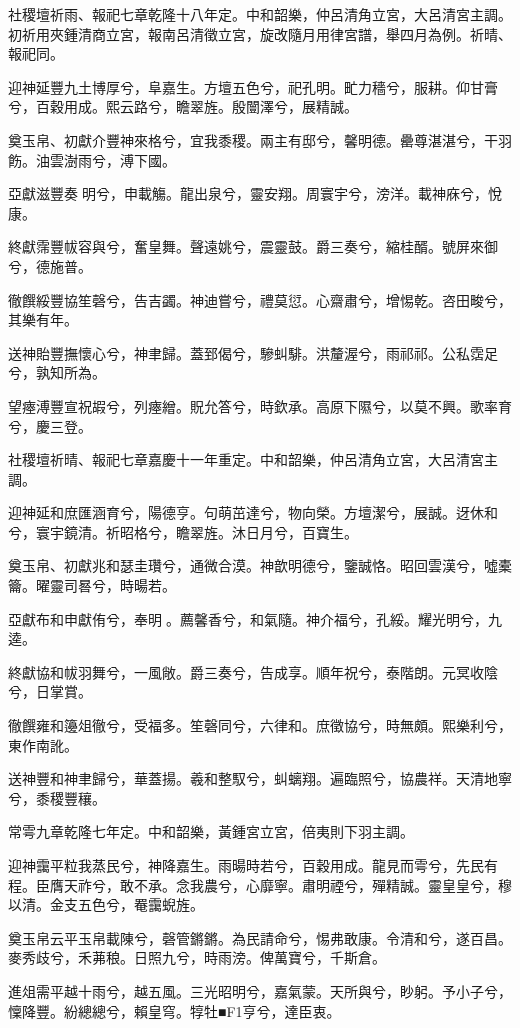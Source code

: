 \begin{pinyinscope}
社稷壇祈雨、報祀七章乾隆十八年定。中和韶樂，仲呂清角立宮，大呂清宮主調。初祈用夾鍾清商立宮，報南呂清徵立宮，旋改隨月用律宮譜，舉四月為例。祈晴、報祀同。

迎神延豐九土博厚兮，阜嘉生。方壇五色兮，祀孔明。甿力穡兮，服耕。仰甘膏兮，百穀用成。熙云路兮，瞻翠旌。殷闓澤兮，展精誠。

奠玉帛、初獻介豐神來格兮，宜我黍稷。兩主有邸兮，馨明德。罍尊湛湛兮，干羽飭。油雲澍雨兮，溥下國。

亞獻滋豐奏明兮，申載觴。龍出泉兮，靈安翔。周寰宇兮，滂洋。載神庥兮，悅康。

終獻霈豐帗容與兮，奮皇舞。聲遠姚兮，震靈鼓。爵三奏兮，縮桂醑。號屏來御兮，德施普。

徹饌綏豐協笙磬兮，告吉蠲。神迪嘗兮，禮莫愆。心齋肅兮，增惕乾。咨田畯兮，其樂有年。

送神貽豐撫懷心兮，神聿歸。蓋郅偈兮，驂虯騑。洪釐渥兮，雨祁祁。公私霑足兮，孰知所為。

望瘞溥豐宣祝嘏兮，列瘞繒。貺允答兮，時欽承。高原下隰兮，以莫不興。歌率育兮，慶三登。

社稷壇祈晴、報祀七章嘉慶十一年重定。中和韶樂，仲呂清角立宮，大呂清宮主調。

迎神延和庶匯涵育兮，陽德亨。句萌茁達兮，物向榮。方壇潔兮，展誠。迓休和兮，寰宇鏡清。祈昭格兮，瞻翠旌。沐日月兮，百寶生。

奠玉帛、初獻兆和瑟圭瓚兮，通微合漠。神歆明德兮，鑒誠恪。昭回雲漢兮，噓橐籥。曜靈司晷兮，時暘若。

亞獻布和申獻侑兮，奉明。薦馨香兮，和氣隨。神介福兮，孔綏。耀光明兮，九逵。

終獻協和帗羽舞兮，一風敞。爵三奏兮，告成享。順年祝兮，泰階朗。元冥收陰兮，日掌賞。

徹饌雍和籩俎徹兮，受福多。笙磬同兮，六律和。庶徵協兮，時無頗。熙樂利兮，東作南訛。

送神豐和神聿歸兮，華蓋揚。羲和整馭兮，虯螭翔。遍臨照兮，協農祥。天清地寧兮，黍稷豐穰。

常雩九章乾隆七年定。中和韶樂，黃鍾宮立宮，倍夷則下羽主調。

迎神靄平粒我蒸民兮，神降嘉生。雨暘時若兮，百穀用成。龍見而雩兮，先民有程。臣膺天祚兮，敢不承。念我農兮，心靡寧。肅明禋兮，殫精誠。靈皇皇兮，穆以清。金支五色兮，罨靄蜺旌。

奠玉帛云平玉帛載陳兮，磬管鏘鏘。為民請命兮，惕弗敢康。令清和兮，遂百昌。麥秀歧兮，禾茀稂。日照九兮，時雨滂。俾萬寶兮，千斯倉。

進俎需平越十雨兮，越五風。三光昭明兮，嘉氣蒙。天所與兮，眇躬。予小子兮，懍降豐。紛總總兮，賴皇穹。犉牡■F1亨兮，達臣衷。


\end{pinyinscope}
